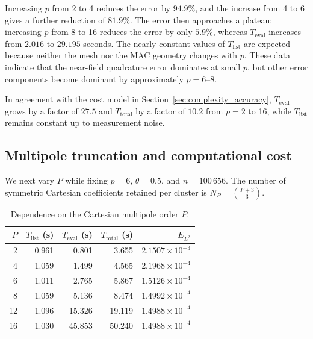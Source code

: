 \documentclass[a4paper,10pt]{article}
\begin{document}
Increasing \(p\) from 2 to 4 reduces the error by \(94.9\%\), and the
increase from 4 to 6 gives a further reduction of \(81.9\%\).  The error
then approaches a plateau: increasing \(p\) from 8 to 16 reduces the error
by only \(5.9\%\), whereas \(T_{\mathrm{eval}}\) increases from \(2.016\)
to \(29.195\) seconds.  The nearly constant values of
\(T_{\mathrm{list}}\) are expected because neither the mesh nor the MAC
geometry changes with \(p\).  These data indicate that the near-field
quadrature error dominates at small \(p\), but other error components
become dominant by approximately \(p=6\)--8.

In agreement with the cost model in
Section~\ref{sec:complexity_accuracy},
\(T_{\mathrm{eval}}\) grows by a factor of \(27.5\) and
\(T_{\mathrm{total}}\) by a factor of \(10.2\) from \(p=2\) to 16, while
\(T_{\mathrm{list}}\) remains constant up to measurement noise.

\subsection{Multipole truncation and computational cost}

We next vary \(P\) while fixing \(p=6\), \(\theta=0.5\), and
\(n=100\,656\).  The number of symmetric Cartesian coefficients retained
per cluster is \(N_P=\binom{P+3}{3}\).

\begin{table}[H]
\centering
\caption{Dependence on the Cartesian multipole order \(P\).}
\label{tab:experiment_P_compact}
\begin{tabular}{rrrrr}
\toprule
\(P\) & \(T_{\mathrm{list}}\) (s) & \(T_{\mathrm{eval}}\) (s) &
\(T_{\mathrm{total}}\) (s) & \(E_{L^2}\)\\
\midrule
2  & 0.961 & 0.801  & 3.655  & \(2.1507\times10^{-3}\)\\
4  & 1.059 & 1.499  & 4.565  & \(2.1968\times10^{-4}\)\\
6  & 1.011 & 2.765  & 5.867  & \(1.5126\times10^{-4}\)\\
8  & 1.059 & 5.136  & 8.474  & \(1.4992\times10^{-4}\)\\
12 & 1.096 & 15.326 & 19.119 & \(1.4988\times10^{-4}\)\\
16 & 1.030 & 45.853 & 50.240 & \(1.4988\times10^{-4}\)\\
\bottomrule
\end{tabular}
\end{table}
\end{document}
